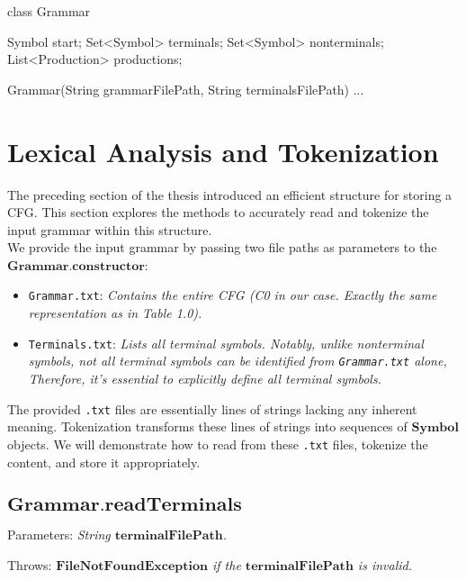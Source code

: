\begin{codeblock}
    class Grammar {
        Symbol start;
        Set<Symbol> terminals;
        Set<Symbol> nonterminals;
        List<Production> productions;

        Grammar(String grammarFilePath, String terminalsFilePath) {}
        ...
    }
\end{codeblock}

\newpage


\section{Lexical Analysis and Tokenization}\label{sec:Lexical Analysis and Tokenization}

The preceding section of the thesis introduced an efficient structure for storing a CFG. This section explores the methods to accurately read and tokenize the input grammar within this structure.\\

We provide the input grammar by passing two file paths as parameters to the \(\boldsymbol{Grammar.constructor}\):
\begin{itemize}
    \item  \texttt{Grammar.txt}: \textit{Contains the entire CFG (C0 in our case. Exactly the same representation as in Table 1.0).}
    \item  \texttt{Terminals.txt}: \textit{Lists all terminal symbols. Notably, unlike nonterminal symbols, not all terminal symbols can be identified from \texttt{Grammar.txt} alone, Therefore, it’s essential to explicitly define all terminal symbols.}
\end{itemize}

The provided \texttt{.txt} files are essentially lines of strings lacking any inherent meaning. Tokenization transforms these lines of strings into sequences of \(\boldsymbol{Symbol}\) objects. We will demonstrate how to read from these \texttt{.txt} files, tokenize the content, and store it appropriately.

\subsection{\(\boldsymbol{Grammar.readTerminals}\)}

Parameters: \textit{String \(\boldsymbol{terminalFilePath}\).}

Throws: \textit{\(\boldsymbol{FileNotFoundException}\) if the \(\boldsymbol{terminalFilePath}\) is invalid.}

